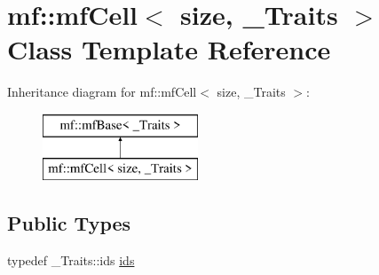 \hypertarget{classmf_1_1mfCell}{
\section{mf::mfCell$<$ size, \_\-Traits $>$ Class Template Reference}
\label{classmf_1_1mfCell}
}
Inheritance diagram for mf::mfCell$<$ size, \_\-Traits $>$:\begin{figure}[H]
\begin{center}
\leavevmode
\includegraphics[height=2.000000cm]{classmf_1_1mfCell}
\end{center}
\end{figure}
\subsection*{Public Types}
\begin{DoxyCompactItemize}
\item 
typedef \_\-Traits::ids \hyperlink{classmf_1_1mfCell_a9e32102899fb1e6b5e95b08a6c71063f}{ids}
\end{DoxyCompactItemize}
